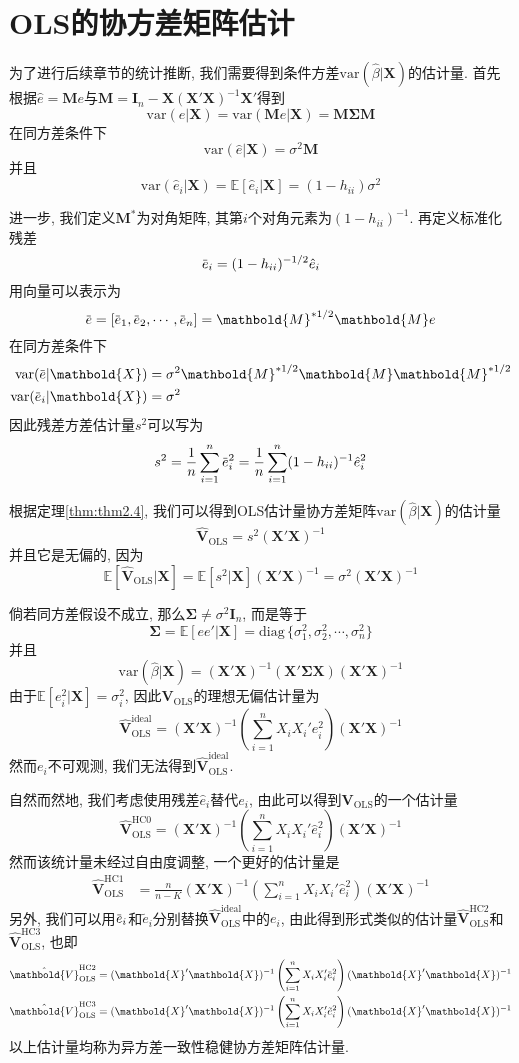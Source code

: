 \documentclass[cn, 12pt, math=mtpro2, bibstyle=apa, blue, twocol]{elegantbook}
\newcommand{\E}{\mathbb{E}}
\newcommand{\var}{\text{var}}
\newcommand{\X}{\mathbold{X}}
\newcommand{\hb}{\hat{\beta}}
\newcommand{\M}{\mathbold{M}}
\newcommand{\overbar}[1]{\mkern 1.5mu\overline{\mkern-1.5mu#1\mkern-1.5mu}\mkern 1.5mu}
\begin{document}
\section{OLS的协方差矩阵估计}
为了进行后续章节的统计推断, 我们需要得到条件方差$\var(\hb|\X)$的估计量. 首先根据$\hat{e}=\M e$与$\M=\mathbold{I}_n-\X(\X'\X)^{-1}\X'$得到
$$\var(\hat{e}|\X)=\var(\M e|\X)=\M\mathbold{\Sigma}\M$$
在同方差条件下
$$\var(\hat{e}|\X)=\sigma^2\M$$
并且
$$\var(\hat{e}_i|\X)=\E[\hat{e}_i|\X]=(1-h_{ii})\sigma^2$$

进一步, 我们定义$\M^\ast$为对角矩阵, 其第$i$个对角元素为$(1-h_{ii})^{-1}$. 再定义标准化残差
$$\overbar{e}_i=(1-h_{ii})^{-1/2}\hat{e}_i$$
用向量可以表示为
$$\overbar{e}=[\overbar{e}_1,\overbar{e}_2,\cdots,\overbar{e}_n]=\M^{\ast 1/2}\M e$$
在同方差条件下
\begin{align*}
\var(\overbar{e}|\X)&=\sigma^2\M^{\ast 1/2}\M\M^{\ast 1/2} \\
\var(\overbar{e}_i|\X)&=\sigma^2
\end{align*}
因此残差方差估计量$s^2$可以写为
$$s^2=\frac{1}{n}\sum_{i=1}^{n}\overbar{e}_i^2=\frac{1}{n}\sum_{i=1}^{n}(1-h_{ii})^{-1}\hat{e}_i^2$$

根据定理\ref{thm:thm2.4}, 我们可以得到OLS估计量协方差矩阵$\var(\hb|\X)$的估计量
$$\hat{\mathbold{V}}_{\text{OLS}}=s^2(\X'\X)^{-1}$$
并且它是无偏的, 因为
$$\E[\hat{\mathbold{V}}_{\text{OLS}}|\X]=\E[s^2|\X](\X'\X)^{-1}=\sigma^2(\X'\X)^{-1}$$

倘若同方差假设不成立, 那么$\mathbold{\Sigma}\neq \sigma^2\mathbold{I}_n$, 而是等于
$$\mathbold{\Sigma}=\E[ee'|\X]=\text{diag}\,\{\sigma_1^2,\sigma_2^2,\cdots,\sigma_n^2\}$$
并且
$$\var(\hb|\X)=(\X'\X)^{-1}(\X'\mathbold{\Sigma}\X)(\X'\X)^{-1}$$
由于$\E[e_i^2|\X]=\sigma_i^2$, 因此$\mathbold{V}_{\text{OLS}}$的理想无偏估计量为
$$\hat{\mathbold{V}}_{\text{OLS}}^\text{ideal}=(\X'\X)^{-1}\left(\sum_{i=1}^{n}X_iX_i'e_i^2\right)(\X'\X)^{-1}$$
然而$e_i$不可观测, 我们无法得到$\hat{\mathbold{V}}_{\text{OLS}}^\text{ideal}$.

自然而然地, 我们考虑使用残差$\hat{e}_i$替代$e_i$, 由此可以得到$\mathbold{V}_{\text{OLS}}$的一个估计量
$$\hat{\mathbold{V}}_{\text{OLS}}^\text{HC0}=(\X'\X)^{-1}\left(\sum_{i=1}^{n}X_iX_i'\hat{e}_i^2\right)(\X'\X)^{-1}$$
然而该统计量未经过自由度调整, 一个更好的估计量是
\begin{align*}
\hat{\mathbold{V}}_{\text{OLS}}^\text{HC1}&=\frac{n}{n-K}(\X'\X)^{-1}\left(\sum_{i=1}^{n}X_iX_i'\hat{e}_i^2\right)(\X'\X)^{-1}
\end{align*}
另外, 我们可以用$\overbar{e}_i$和$\tilde{e}_i$分别替换$\hat{\mathbold{V}}_{\text{OLS}}^\text{ideal}$中的$e_i$, 由此得到形式类似的估计量$\hat{\mathbold{V}}_{\text{OLS}}^\text{HC2}$和$\hat{\mathbold{V}}_{\text{OLS}}^\text{HC3}$, 也即
\begin{align*}
\hat{\mathbold{V}}_{\text{OLS}}^\text{HC2}&=(\X'\X)^{-1}\left(\sum_{i=1}^{n}X_iX_i'\overbar{e}_i^2\right)(\X'\X)^{-1} \\
\hat{\mathbold{V}}_{\text{OLS}}^\text{HC3}&=(\X'\X)^{-1}\left(\sum_{i=1}^{n}X_iX_i'\tilde{e}_i^2\right)(\X'\X)^{-1}
\end{align*}
以上估计量均称为异方差一致性稳健协方差矩阵估计量.
\end{document}
